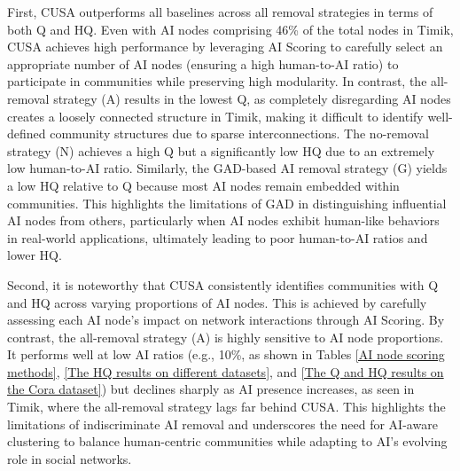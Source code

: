 First, CUSA outperforms all baselines across all removal strategies in terms of both Q and HQ. Even with AI nodes comprising 46\% of the total nodes in Timik, CUSA achieves high performance by leveraging AI Scoring to carefully select an appropriate number of AI nodes (ensuring a high human-to-AI ratio) to participate in communities while preserving high modularity. In contrast, the all-removal strategy (A) results in the lowest Q, as completely disregarding AI nodes creates a loosely connected structure in Timik, making it difficult to identify well-defined community structures due to sparse interconnections. The no-removal strategy (N) achieves a high Q but a significantly low HQ due to an extremely low human-to-AI ratio. Similarly, the GAD-based AI removal strategy (G) yields a low HQ relative to Q because most AI nodes remain embedded within communities. This highlights the limitations of GAD in distinguishing influential AI nodes from others, particularly when AI nodes exhibit human-like behaviors in real-world applications, ultimately leading to poor human-to-AI ratios and lower HQ. 

Second, it is noteworthy that CUSA consistently identifies communities with Q and HQ across varying proportions of AI nodes. This is achieved by carefully assessing each AI node's impact on network interactions through AI Scoring. By contrast, the all-removal strategy (A) is highly sensitive to AI node proportions. It performs well at low AI ratios (e.g., 10\%, as shown in Tables \ref{AI node scoring methods}, \ref{The HQ results on different datasets}, and \ref{The Q and HQ results on the Cora dataset}) but declines sharply as AI presence increases, as seen in Timik, where the all-removal strategy lags far behind CUSA. This highlights the limitations of indiscriminate AI removal and underscores the need for AI-aware clustering to balance human-centric communities while adapting to AI’s evolving role in social networks.

\begingroup
\renewcommand{\arraystretch}{1.1}
\begin{table}[t]
\centering
\caption{The HMR and ADM results on different datasets obtained by CUSA.}
\label{The HMR and ADM results of CUSA across different datasets}
\end{table}
\endgroup

